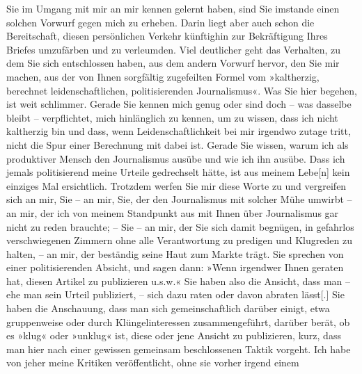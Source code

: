 \begin{ledgroupsized}[t]{13cm}
               Sie im Umgang mit mir an mir kennen gelernt haben, sind Sie imstande einen solchen
               Vorwurf gegen mich zu erheben. Darin liegt aber auch schon die Bereitschaft, diesen
               persönlichen Verkehr künftighin zur Bekräftigung Ihres Briefes umzufärben und zu
               verleumden.\pend
           \pstart
           Viel deutlicher geht das Verhalten, zu dem Sie sich entschlossen haben, aus dem
               andern Vorwurf hervor, den Sie mir machen, aus der von Ihnen sorgfältig zugefeilten
               Formel vom »kaltherzig, berechnet leidenschaftlichen, politisierenden Journalismus«.
               Was Sie hier begehen, ist weit schlimmer. Gerade Sie kennen mich genug oder sind doch
               – was dasselbe bleibt – verpflichtet, mich hinlänglich zu kennen, um zu wissen, dass
               ich nicht kaltherzig bin und dass, wenn Leidenschaftlichkeit bei mir irgendwo zutage
               tritt, nicht die Spur einer Berechnung mit dabei ist. Gerade Sie wissen, warum ich
               als produktiver Mensch den Journalismus ausübe und wie ich ihn ausübe. Dass ich
               jemals politisierend meine Urteile gedrechselt hätte, ist aus meinem
                  Lebe{[}n{]} kein einziges Mal ersichtlich. Trotzdem werfen Sie mir
               diese Worte zu und vergreifen sich an mir, Sie – an mir, Sie, der den Journalismus
               mit solcher Mühe umwirbt – an mir, der ich von meinem Standpunkt aus mit Ihnen über
               Journalismus gar nicht zu reden brauchte; – Sie – an mir, der Sie sich damit
               begnügen, in gefahrlos verschwiegenen Zimmern ohne alle Verantwortung zu pre{\pb}digen und Klugreden zu halten, –
               an mir, der beständig seine Haut zum Markte trägt.\pend
           \pstart
           Sie sprechen von einer politisierenden Absicht, und sagen dann: »Wenn irgendwer Ihnen
               geraten hat, diesen Artikel zu publizieren u.s.w.« Sie haben also die Ansicht, dass
               man – ehe man sein Urteil publiziert, – sich dazu raten oder davon abraten
                  lässt{[}.{]} Sie haben die Anschauung, dass man sich
               gemeinschaftlich darüber einigt, etwa gruppenweise oder durch Klüngelinteressen
               zusammengeführt, darüber berät, ob es »klug« oder »unklug« ist, diese oder jene
               Ansicht zu publizieren, kurz, dass man hier nach einer gewissen gemeinsam
               beschlossenen Taktik vorgeht.\pend
           \pstart
           Ich habe von jeher meine Kritiken veröffentlicht, ohne sie vorher irgend einem

\end{ledgroupsized}
